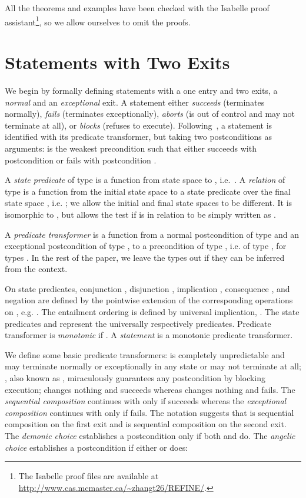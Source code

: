 \documentclass[submission,copyright,creativecommons]{eptcs}
\begin{document}
All the theorems and examples have been checked with the Isabelle proof assistant\footnote{The Isabelle proof files are available at \url{http://www.cas.mcmaster.ca/~zhangt26/REFINE/}.}, so we allow ourselves to omit the proofs.

\section{Statements with Two Exits}
\label{sec:basic}

We begin by formally defining statements with a one entry and two exits, a {\em normal} and an {\em exceptional} exit.  A statement either {\em succeeds} (terminates normally), {\em fails} (terminates exceptionally), {\em aborts} (is out of control and may not terminate at all), or {\em blocks} (refuses to execute). Following~\cite{BackVonWright98RefinementCalculus}, a statement  is identified with its predicate transformer, but taking two postconditions as arguments:  is the weakest precondition such that either  succeeds with postcondition  or  fails with postcondition .

A {\em state predicate} of type  is a function from state space  to , i.e.~. A {\em relation} of type  is a function from the initial state space  to a state predicate over the final state space , i.e. ; we allow the initial and final state spaces to be different. It is isomorphic to , but allows the test if  is in relation  to be simply written as .

A {\em predicate transformer} is a function from a normal postcondition of type  and an exceptional postcondition of type , to a precondition of type , i.e. of type , for types . In the rest of the paper, we leave the types out if they can be inferred from the context.

On state predicates, conjunction , disjunction , implication , consequence , and negation  are defined by the pointwise extension of the corresponding operations on , e.g. . The entailment ordering  is defined by universal implication, . The state predicates  and  represent the universally  respectively  predicates. Predicate transformer  is {\em monotonic} if . A {\em statement} is a monotonic predicate transformer.



We define some basic predicate transformers:  is completely unpredictable and may terminate normally or exceptionally in any state or may not terminate at all; , also known as , miraculously guarantees any postcondition by blocking execution;  changes nothing and succeeds whereas  changes nothing and fails. The {\em sequential composition}  continues with  only if  succeeds whereas the {\em exceptional composition}  continues with  only if  fails. The notation suggests that  is sequential composition on the first exit and  is sequential composition on the second exit. The {\em demonic choice}  establishes a postcondition only if both  and  do. The {\em angelic choice}  establishes a postcondition if either  or  does:
\end{document}
